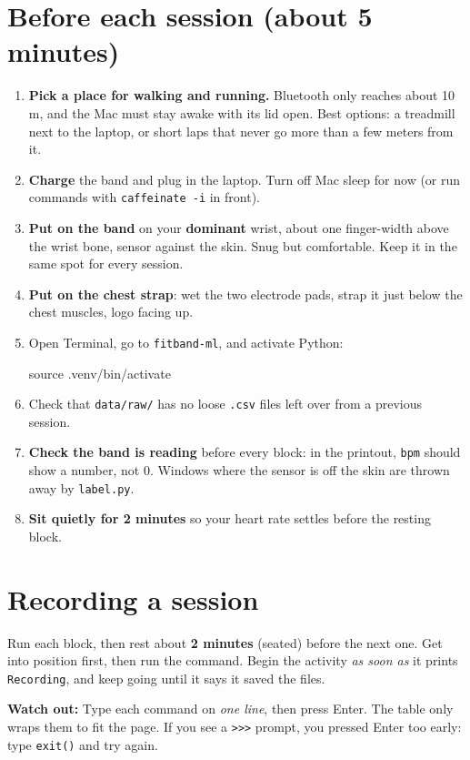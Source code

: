 \documentclass[11pt]{article}
\newcommand{\cmd}[1]{\par\smallskip\colorbox{black!6}{\parbox{\dimexpr\linewidth-2\fboxsep}{\ttfamily\small #1}}\par\smallskip}
\newcommand{\warn}[1]{\par{\color{warn}\textbf{Watch out:} #1}\par}
\begin{document}
\section{Before each session (about 5 minutes)}
\begin{enumerate}[label=\arabic*.]
  \item \textbf{Pick a place for walking and running.} Bluetooth only reaches about 10 m, and the Mac must stay
        awake with its lid open. Best options: a treadmill next to the laptop, or short laps that never go more
        than a few meters from it.
  \item \textbf{Charge} the band and plug in the laptop. Turn off Mac sleep for now
        (or run commands with \texttt{caffeinate -i} in front).
  \item \textbf{Put on the band} on your \textbf{dominant} wrist, about one finger-width above the wrist bone,
        sensor against the skin. Snug but comfortable. Keep it in the same spot for every session.
  \item \textbf{Put on the chest strap}: wet the two electrode pads, strap it just below the chest muscles,
        logo facing up.
  \item Open Terminal, go to \texttt{fitband-ml}, and activate Python:
  \cmd{source .venv/bin/activate}
  \item Check that \texttt{data/raw/} has no loose \texttt{.csv} files left over from a previous session.
  \item \textbf{Check the band is reading} before every block: in the printout, \texttt{bpm} should show a
        number, not 0. Windows where the sensor is off the skin are thrown away by \texttt{label.py}.
  \item \textbf{Sit quietly for 2 minutes} so your heart rate settles before the resting block.
\end{enumerate}

\section{Recording a session}
Run each block, then rest about \textbf{2 minutes} (seated) before the next one. Get into position
first, then run the command. Begin the activity \emph{as soon as} it prints \texttt{Recording}, and keep going
until it says it saved the files.

\warn{Type each command on \emph{one line}, then press Enter. The table only wraps them to fit the page.
If you see a \texttt{>>>} prompt, you pressed Enter too early: type \texttt{exit()} and try again.}
\end{document}
